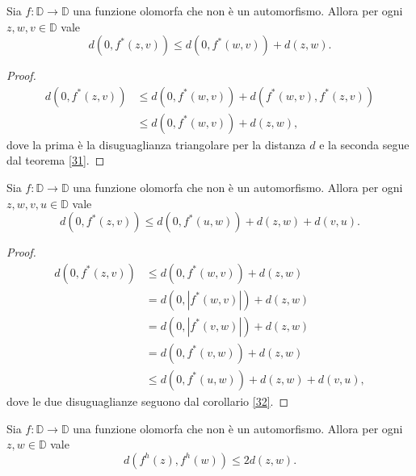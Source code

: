 \begin{cor} \label{32}
  Sia $f:\mathbb{D} \longrightarrow \mathbb{D}$ una funzione olomorfa che non è un automorfismo. Allora per ogni $z, w, v \in \mathbb{D}$ vale
  \begin{equation}
    d(0, f^*(z,v)) \le d(0,f^*(w,v))+d(z,w).
  \end{equation}
\end{cor}

\begin{proof}
  \begin{align*}
    d(0,f^*(z,v)) & \le d(0,f^*(w,v))+d(f^*(w,v),f^*(z,v)) \\
    & \le d(0,f^*(w,v))+d(z,w),
  \end{align*}
  dove la prima è la disuguaglianza triangolare per la distanza $d$ e la seconda segue dal teorema \ref{31}.
\end{proof}

\begin{cor} \label{33}
  Sia $f:\mathbb{D} \longrightarrow \mathbb{D}$ una funzione olomorfa che non è un automorfismo. Allora per ogni $z, w, v, u \in \mathbb{D}$ vale
  \begin{equation}
    d(0, f^*(z,v)) \le d(0, f^*(u,w))+d(z,w)+d(v,u).
  \end{equation}
\end{cor}

\begin{proof}
  \begin{align*}
    d(0,f^*(z,v)) & \le d(0,f^*(w,v))+d(z,w) \\
    & =d(0,|f^*(w,v)|)+d(z,w) \\
    & =d(0,|f^*(v,w)|)+d(z,w) \\
    & =d(0,f^*(v,w))+d(z,w) \\
    & \le d(0,f^*(u,w))+d(z,w)+d(v,u),
  \end{align*}
  dove le due disuguaglianze seguono dal corollario \ref{32}.
\end{proof}

\begin{cor} \label{quasigolusin}
  Sia $f:\mathbb{D} \longrightarrow \mathbb{D}$ una funzione olomorfa che non è un automorfismo. Allora per ogni $z, w \in \mathbb{D}$ vale
  \begin{equation} \label{quasigol}
    d(f^h(z), f^h(w)) \le 2d(z,w).
  \end{equation}
\end{cor}

